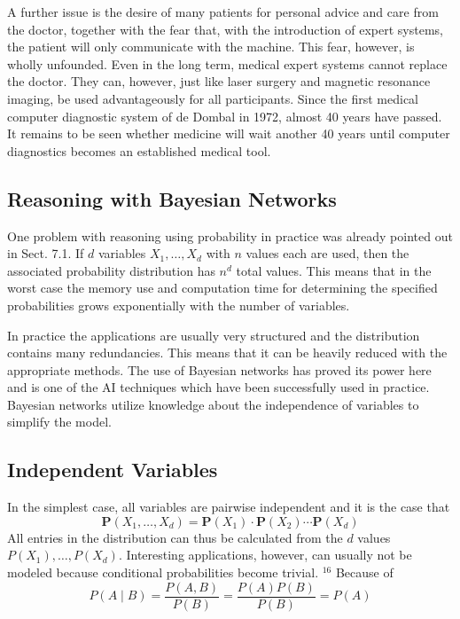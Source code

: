 \documentclass[10pt]{book}
\begin{document}
A further issue is the desire of many patients for personal advice and care from the doctor, together with the fear that, with the introduction of expert systems, the patient will only communicate with the machine. This fear, however, is wholly unfounded. Even in the long term, medical expert systems cannot replace the doctor. They can, however, just like laser surgery and magnetic resonance imaging, be used advantageously for all participants. Since the first medical computer diagnostic system of de Dombal in 1972, almost 40 years have passed. It remains to be seen whether medicine will wait another 40 years until computer diagnostics becomes an established medical tool.

\subsection{Reasoning with Bayesian Networks}
One problem with reasoning using probability in practice was already pointed out in Sect. 7.1. If $d$ variables $X_{1}, \ldots, X_{d}$ with $n$ values each are used, then the associated probability distribution has $n^{d}$ total values. This means that in the worst case the memory use and computation time for determining the specified probabilities grows exponentially with the number of variables.

In practice the applications are usually very structured and the distribution contains many redundancies. This means that it can be heavily reduced with the appropriate methods. The use of Bayesian networks has proved its power here and is one of the AI techniques which have been successfully used in practice. Bayesian networks utilize knowledge about the independence of variables to simplify the model.

\subsection{Independent Variables}
In the simplest case, all variables are pairwise independent and it is the case that
$$
\boldsymbol{P}\left(X_{1}, \ldots, X_{d}\right)=\boldsymbol{P}\left(X_{1}\right) \cdot \boldsymbol{P}\left(X_{2}\right) \cdots \boldsymbol{P}\left(X_{d}\right)
$$
All entries in the distribution can thus be calculated from the $d$ values $P\left(X_{1}\right), \ldots, P\left(X_{d}\right)$. Interesting applications, however, can usually not be modeled because conditional probabilities become trivial. ${ }^{16}$ Because of
$$
P(A \mid B)=\frac{P(A, B)}{P(B)}=\frac{P(A) P(B)}{P(B)}=P(A)
$$
\end{document}
